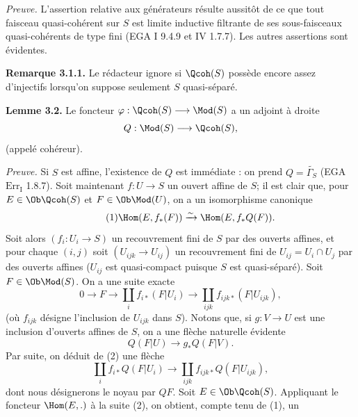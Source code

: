 \emph{Preuve.} L'assertion relative aux générateurs résulte aussitôt de ce que tout faisceau quasi-cohérent sur $S$ est limite inductive filtrante de ses sous-faisceaux quasi-cohérents de type fini (EGA I 9.4.9 et IV 1.7.7). Les autres assertions sont évidentes.

\textbf{Remarque 3.1.1.} Le rédacteur ignore si $\Qcoh(S)$ possède encore assez d'injectifs lorsqu'on suppose seulement $S$ quasi-séparé.

\textbf{Lemme 3.2.} Le foncteur $\varphi:\Qcoh(S)\longrightarrow\Mod(S)$ a un adjoint à droite
\[
 Q:\Mod(S)\longrightarrow\Qcoh(S),
\]
(appelé cohéreur).

\emph{Preuve.} Si $S$ est affine, l'existence de $Q$ est immédiate : on prend $Q=\widetilde{\Gamma_S}$ (EGA $\mathrm{Err}_{\mathrm I}$ 1.8.7). Soit maintenant $f:U\longrightarrow S$ un ouvert affine de $S$; il est clair que, pour $E\in\Ob\Qcoh(S)$ et $F\in\Ob\Mod(U)$, on a un isomorphisme canonique
\begin{equation}\tag{1}
 \Hom(E,f_*(F))\xrightarrow{\sim} \Hom(E,f_*Q(F)).
\end{equation}
Soit alors $(f_i:U_i\longrightarrow S)$ un recouvrement fini de $S$ par des ouverts affines, et pour chaque $(i,j)$ soit $(U_{ijk}\longrightarrow U_{ij})$ un recouvrement fini de $U_{ij}=U_i\cap U_j$ par des ouverts affines ($U_{ij}$ est quasi-compact puisque $S$ est quasi-séparé). Soit $F\in\Ob\Mod(S)$. On a une suite exacte
\begin{equation}\tag{2}
 0\longrightarrow F\longrightarrow \coprod_i f_{i*}(F|U_i)
 \longrightarrow \coprod_{ijk}f_{ijk*}(F|U_{ijk}),
\end{equation}
(où $f_{ijk}$ désigne l'inclusion de $U_{ijk}$ dans $S$). Notons que, si $g:V\longrightarrow U$ est une inclusion d'ouverts affines de $S$, on a une flèche naturelle évidente
\[
 Q(F|U)\longrightarrow g_*Q(F|V).
\]
Par suite, on déduit de (2) une flèche
\begin{equation}\tag{3}
 \coprod_i f_{i*}Q(F|U_i)\longrightarrow
 \coprod_{ijk}f_{ijk*}Q(F|U_{ijk}),
\end{equation}
dont nous désignerons le noyau par $QF$. Soit $E\in\Ob\Qcoh(S)$. Appliquant le foncteur $\Hom(E,.)$ à la suite (2), on obtient, compte tenu de (1), un
